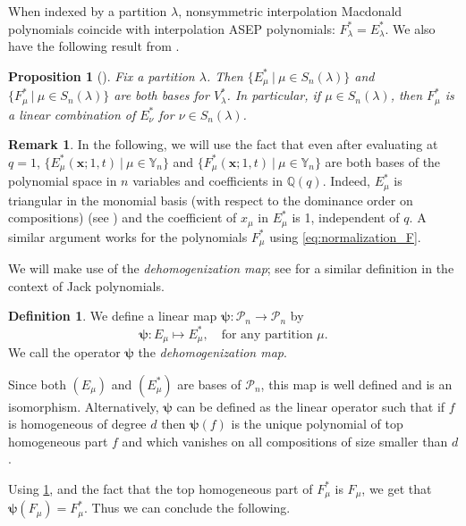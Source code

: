 \documentclass[12pt]{amsart}
\newtheorem{prop}[thm]{Proposition}
\theoremstyle{definition}
\newtheorem{definition}[thm]{Definition}
\newtheorem{remark}[thm]{Remark}
\newcommand{\bfx}{\boldsymbol{x}}
\newcommand{\mcP}{\mathcal P}
\newcommand{\QQ}{\mathbb Q}
\newcommand{\VV}{V_{\lambda}^*}
\newcommand{\YY}{\mathbb Y}
\begin{document}
\begin{appendices}
When indexed by a partition $\lambda$, nonsymmetric interpolation Macdonald polynomials coincide with interpolation ASEP polynomials: $F^*_\lambda=E^*_\lambda$. We also have the following 
result from \cite[Lemma 2.5 and Proposition 2.14]{BenDaliWilliams2025}.
\begin{prop}[\cite{BenDaliWilliams2025}]\label{prop:Vstar}
    Fix  a partition $\lambda$. Then $\{E_{\mu}^* \ \vert \ \mu\in S_n(\lambda)\}$ and $\{F_{\mu}^* \ \vert \ \mu\in S_n(\lambda)\}$ are both bases for $\VV$. In particular, if $\mu\in S_n(\lambda)$, then $F^*_\mu$ is a linear combination of $E_{\nu}^*$ for $\nu\in S_n(\lambda)$.
\end{prop}
\begin{remark}\label{rmk:basis_1}
In the following, we will use the fact that even after evaluating at $q=1$, $\{E^*_\mu(\bfx;1,t) \ \vert \ {\mu\in \YY_n}\}$ and $\{F^*_\mu(\bfx;1,t) \ \vert \ {\mu\in \YY_n}\}$  are both bases of the polynomial space in $n$ variables and coefficients in $\QQ(q)$. Indeed, $E^*_\mu$ is triangular in the monomial basis (with respect to the dominance order on compositions) (see \cite[Theorem 3.11]{Knop1997b}) and the coefficient of $x_\mu$ in $E^*_\mu$ is 1, independent of $q$. A similar argument works for the polynomials $F^*_\mu$ using \cref{eq:normalization_F}.
\end{remark}

    

We will make use of the \emph{dehomogenization map}; see \cite[Definition 3.1 and Theorem 3.8]{NakviSahiSergel2023} for a similar definition in the context of Jack polynomials.
\begin{definition}\label{def:dehom}
We define a linear map $\boldsymbol{\psi}:\mcP_n \to \mcP_n$ by 
\begin{equation}
 \boldsymbol{\psi}: E_\mu\mapsto E_\mu^*, \quad\text{for any partition $\mu$.}   
\end{equation}
We call the operator $\boldsymbol{\psi}$ the \emph{dehomogenization map}.
\end{definition}

Since both $(E_\mu)$ and $(E_\mu^*)$ are bases of $\mcP_n$, this map is well defined and is an isomorphism.
Alternatively, $\boldsymbol{\psi}$ can be defined as the linear operator such that if $f$ is homogeneous of degree $d$ then $\boldsymbol{\psi}(f)$ is the unique polynomial of top homogeneous part $f$ and which vanishes on all compositions of size smaller than $d$. 

Using \cref{prop:Vstar}, and the fact that the top homogeneous part of $F^*_\mu$ is $F_\mu$, we get that
$\boldsymbol{\psi}(F_\mu)=F_\mu^*$. Thus we can conclude the following.


\end{appendices}
\end{document}
